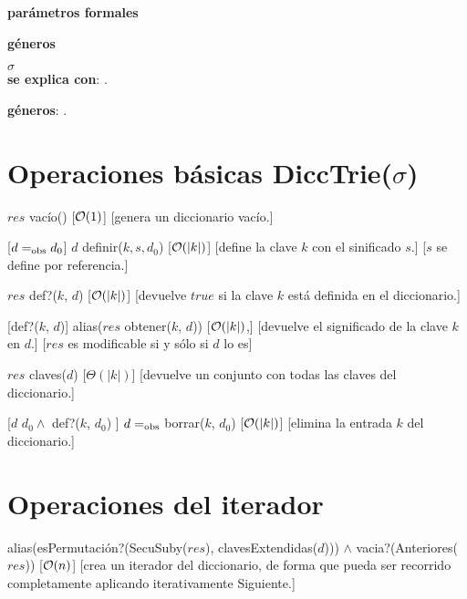 \begin{Interfaz}
  \textbf{parámetros formales}\parindent\\
  \parbox{1.7cm}{\textbf{géneros}} $\sigma$\\
      
  \textbf{se explica con}: .

  \textbf{géneros}: .

  \section*{Operaciones básicas DiccTrie($\sigma$)}

  {$res$ \igobs vacío()}
  [$\mathcal{O}(1)$]
  [genera un diccionario vacío.]

  [$d =_{\mathrm{obs}} d_0$]  
  {$d$ \igobs definir($k, s, d_0$)}
  [$\mathcal{O}(|k|)$]
  [define la clave $k$ con el sinificado $s$.]
  [$s$ se define por referencia.]
    
  {$res$ \igobs def?($k$, $d$) }
  [$\mathcal{O}(|k|)$]
  [devuelve $true$ si la clave $k$ está definida en el diccionario.]
  
  [def?($k$, $d$)]  
  {alias($res$ \igobs obtener($k$, $d$))}
  [$\mathcal{O}(|k|)$,]
  [devuelve el significado de la clave $k$ en $d$.]
  [$res$ es modificable si y sólo si $d$ lo es]
  
  {$res$ \igobs claves($d$)}
  [$\Theta(|k|)$]
  [devuelve un conjunto con todas las claves del diccionario.] 
  
  [$d$ \igobs $d_0 \land$ def?($k$, $d_0$) ]
  {$d =_{\mathrm{obs}}$ borrar($k$, $d_0$)}
  [$\mathcal{O}(|k|)$]
  [elimina la entrada $k$ del diccionario.] 
\newpage 
  \section*{Operaciones del iterador}

  {alias(esPermutación?(SecuSuby($res$), clavesExtendidas($d$))) $\land$ vacia?(Anteriores($res$))}
  [$\mathcal{O}(n)$]
  [crea un iterador del diccionario, de forma que pueda ser recorrido completamente aplicando iterativamente Siguiente.]
  

\end{Interfaz}

